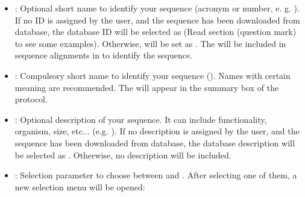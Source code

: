 \begin{itemize}
  \begin{itemize}
  \item {}: Optional short name to identify your sequence (acronym or number, e. g. ). If no ID is assigned by the user, and the sequence has been downloaded from  database, the database ID will be selected as  (Read  section (question mark) to see some examples). Otherwise,  will be set as . The  will be included in sequence alignments in \chimera to identify the sequence.
  \item {}: Compulsory short name to identify your sequence (). Names with certain meaning are recommended. The  will appear in the summary box of the \scipion protocol.
  \item {}: Optional description of your sequence. It can include functionality, organism, size, etc... (e.g. ). If no description is assigned by the user, and the sequence has been downloaded from  database, the database description will be selected as . Otherwise, no description will be included.
  \item {}: Selection parameter to choose between  and . After selecting one of them, a new selection menu will be opened:
  

\end{itemize}
\end{itemize}
